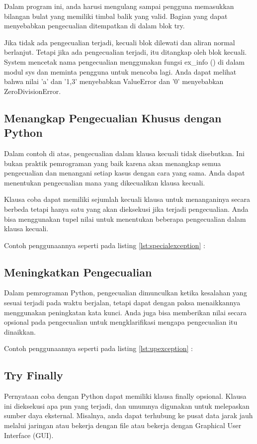 Dalam program ini, anda harusi mengulang sampai pengguna memasukkan bilangan bulat yang memiliki timbal balik yang valid. Bagian yang dapat menyebabkan pengecualian ditempatkan di dalam blok try.

Jika tidak ada pengecualian terjadi, kecuali blok dilewati dan aliran normal berlanjut. Tetapi jika ada pengecualian terjadi, itu ditangkap oleh blok kecuali. System mencetak nama pengecualian menggunakan fungsi ex\_info () di dalam modul sys dan meminta pengguna untuk mencoba lagi. Anda dapat melihat bahwa nilai 'a' dan '1,3' menyebabkan ValueError dan '0' menyebabkan ZeroDivisionError.

\subsection{Menangkap Pengecualian Khusus dengan Python}
Dalam contoh di atas, pengecualian dalam klausa kecuali tidak disebutkan. Ini bukan praktik pemrograman yang baik karena akan menangkap semua pengecualian dan menangani setiap kasus dengan cara yang sama. Anda dapat menentukan pengecualian mana yang dikecualikan klausa kecuali.

Klausa coba dapat memiliki sejumlah kecuali klausa untuk menanganinya secara berbeda tetapi hanya satu yang akan dieksekusi jika terjadi pengecualian. Anda bisa menggunakan tupel nilai untuk menentukan beberapa pengecualian dalam klausa kecuali. 

Contoh penggunaannya seperti pada listing \ref{lst:specialexception} :


\subsection{Meningkatkan Pengecualian}
Dalam pemrograman Python, pengecualian dimunculkan ketika kesalahan yang sesuai terjadi pada waktu berjalan, tetapi dapat dengan paksa menaikkannya menggunakan peningkatan kata kunci. Anda juga bisa memberikan nilai secara opsional pada pengecualian untuk mengklarifikasi mengapa pengecualian itu dinaikkan.

Contoh penggunaannya seperti pada listing \ref{lst:upexception} :


\subsection{Try Finally}
Pernyataan coba dengan Python dapat memiliki klausa finally opsional. Klausa ini dieksekusi apa pun yang terjadi, dan umumnya digunakan untuk melepaskan sumber daya eksternal. Misalnya, anda dapat terhubung ke pusat data jarak jauh melalui jaringan atau bekerja dengan file atau bekerja dengan Graphical User Interface (GUI). 

